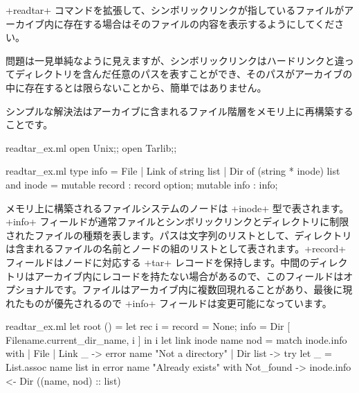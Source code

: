 \begin{exercise}\label{ex/readtar}
\ml+readtar+ コマンドを拡張して、シンボリックリンクが指しているファイルがアーカイブ内に存在する場合はそのファイルの内容を表示するようにしてください。
\end{exercise}
\begin{answer}
問題は一見単純なように見えますが、シンボリックリンクはハードリンクと違ってディレクトリを含んだ任意のパスを表すことができ、そのパスがアーカイブの中に存在するとは限らないことから、簡単ではありません。

シンプルな解決法はアーカイブに含まれるファイル階層をメモリ上に再構築することです。
%
\begin{codefile}{readtar_ex.ml}
open Unix;;
open Tarlib;;
\end{codefile}
%
\begin{listingcodefile}{readtar_ex.ml}
type info = File | Link of string list | Dir of (string * inode) list
and inode = { mutable record : record option; mutable info : info;}
\end{listingcodefile}
%
メモリ上に構築されるファイルシステムのノードは \ml+inode+ 型で表されます。\ml+info+ フィールドが通常ファイルとシンボリックリンクとディレクトリに制限されたファイルの種類を表します。パスは文字列のリストとして、ディレクトリは含まれるファイルの名前とノードの組のリストとして表されます。\ml+record+ フィールドはノードに対応する \ml+tar+ レコードを保持します。中間のディレクトリはアーカイブ内にレコードを持たない場合があるので、このフィールドはオプショナルです。ファイルはアーカイブ内に複数回現れることがあり、最後に現れたものが優先されるので \ml+info+ フィールドは変更可能になっています。
%
\begin{listingcodefile}{readtar_ex.ml}
let root () =
  let rec i =
    { record = None; info = Dir [ Filename.current_dir_name, i ] }
  in i
let link inode name nod = match inode.info with
  | File | Link _ -> error name "Not a directory"
  | Dir list ->
      try let _ = List.assoc name list in error name "Already exists"
      with Not_found -> inode.info <- Dir ((name, nod) :: list)


\end{listingcodefile}
\end{answer}
